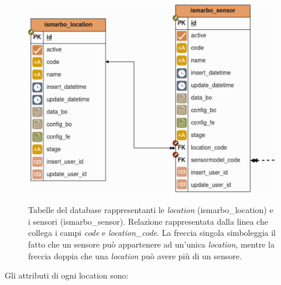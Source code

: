\documentclass[./main.tex]{subfiles}
\begin{document}
\begin{figure}[!ht]
\noindent\begin{minipage}{0.6\textwidth}
\vspace{1cm}
\includegraphics[width=\textwidth]{images/db_location_sensor.pdf}
\captionsetup{font=small, hypcap=false}
\label{fig:db_location_sensor}
\end{minipage}
\hspace{0.05\textwidth}
\begin{minipage}{0.3\textwidth}
\begin{small}
Tabelle del database rappresentanti le \textit{location} (ismarbo\_location) e i sensori (ismarbo\_sensor). Relazione rappresentata dalla linea che collega i campi \textit{code} e \textit{location\_code}. La freccia singola simboleggia il fatto che un sensore può appartenere ad un'unica \textit{location}, mentre la freccia doppia che una \textit{location} può avere più di un sensore.
\end{small}
\end{minipage}
\vspace{0.25cm}
\end{figure}

Gli attributi di ogni location sono:
\end{document}
